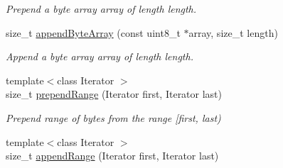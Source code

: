 \begin{DoxyCompactItemize}
\begin{DoxyCompactList}\small\item\em Prepend a byte array {\ttfamily array} of length {\ttfamily length}. \end{DoxyCompactList}\item 
size\+\_\+t \hyperlink{classndn_1_1encoding_1_1Estimator_a81462ef7003dd66cf50a9688085c883b}{append\+Byte\+Array} (const uint8\+\_\+t $\ast$array, size\+\_\+t length)\hypertarget{classndn_1_1encoding_1_1Estimator_a81462ef7003dd66cf50a9688085c883b}{}\label{classndn_1_1encoding_1_1Estimator_a81462ef7003dd66cf50a9688085c883b}

\begin{DoxyCompactList}\small\item\em Append a byte array {\ttfamily array} of length {\ttfamily length}. \end{DoxyCompactList}\item 
{\footnotesize template$<$class Iterator $>$ }\\size\+\_\+t \hyperlink{classndn_1_1encoding_1_1Estimator_a34d843dfd17929640616a4ef83f4baac}{prepend\+Range} (Iterator first, Iterator last)\hypertarget{classndn_1_1encoding_1_1Estimator_a34d843dfd17929640616a4ef83f4baac}{}\label{classndn_1_1encoding_1_1Estimator_a34d843dfd17929640616a4ef83f4baac}

\begin{DoxyCompactList}\small\item\em Prepend range of bytes from the range \mbox{[}{\ttfamily first}, {\ttfamily last}) \end{DoxyCompactList}\item 
{\footnotesize template$<$class Iterator $>$ }\\size\+\_\+t \hyperlink{classndn_1_1encoding_1_1Estimator_a19e76a87c255c55e04ddd5eb4e596c61}{append\+Range} (Iterator first, Iterator last)\hypertarget{classndn_1_1encoding_1_1Estimator_a19e76a87c255c55e04ddd5eb4e596c61}{}\label{classndn_1_1encoding_1_1Estimator_a19e76a87c255c55e04ddd5eb4e596c61}


\end{DoxyCompactItemize}
